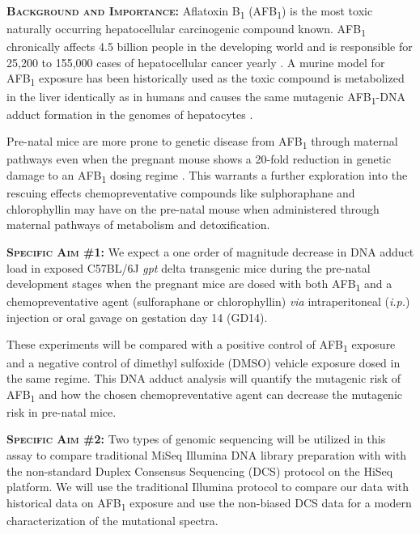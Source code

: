 \documentclass[12pt]{article}
\let\cite\shortcite %
\begin{document}
\noindent\textbf{\textsc{Background and Importance:}}
Aflatoxin B\textsubscript{1} (AFB\textsubscript{1}) is the most toxic naturally occurring hepatocellular carcinogenic compound known.
AFB\textsubscript{1} chronically affects 4.5 billion people in the developing world and is responsible for  25,200 to 155,000 cases of hepatocellular cancer yearly \cite{Liu2010}.
A murine model for AFB\textsubscript{1} exposure has been historically used as the toxic compound is metabolized in the liver identically as in humans and causes the same mutagenic AFB\textsubscript{1}-DNA adduct formation in the genomes of hepatocytes \cite{Fiala2011}.

Pre-natal mice are more prone to genetic disease from AFB\textsubscript{1} through maternal pathways even when the pregnant mouse shows a 20-fold reduction in genetic damage to an AFB\textsubscript{1} dosing regime \cite{Chawanthayatham2014a}. This warrants a further exploration into the rescuing effects chemopreventative compounds like sulphoraphane and chlorophyllin may have on the pre-natal mouse when administered through maternal pathways of metabolism and detoxification.


\vspace{5mm}\noindent\textbf{\textsc{Specific Aim \#1:}}
We expect a one order of magnitude decrease in DNA adduct load in exposed C57BL/6J \textit{gpt} delta transgenic mice during the pre-natal development stages when the pregnant mice are dosed with both AFB\textsubscript{1} and a chemopreventative agent (sulforaphane or chlorophyllin) \textit{via} intraperitoneal (\textit{i.p.}) injection or oral gavage on gestation day 14 (GD14).

These experiments will be compared with a positive control of AFB\textsubscript{1} exposure and a negative control of dimethyl sulfoxide (DMSO) vehicle exposure dosed in the same regime.
This DNA adduct analysis will quantify the mutagenic risk of AFB\textsubscript{1} and how the chosen chemopreventative agent can decrease the mutagenic risk in pre-natal mice.

\vspace{5mm}\noindent\textbf{\textsc{Specific Aim \#2:}}
Two types of genomic sequencing will be utilized in this assay to compare traditional MiSeq Illumina DNA library preparation with with the non-standard Duplex Consensus Sequencing (DCS) protocol on the HiSeq platform. We will use the traditional Illumina protocol to compare our data with historical data on AFB\textsubscript{1} exposure and use the non-biased DCS data for a modern characterization of the mutational spectra.
\end{document}
